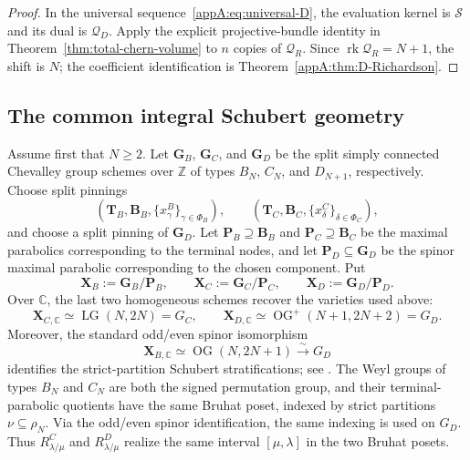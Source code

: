 \documentclass[11pt,a4paper,oneside]{amsart}
\numberwithin{equation}{section}
\theoremstyle{definition}
\theoremstyle{remark}
\begin{document}
\begin{proof}
In the universal sequence~\eqref{appA:eq:universal-D}, the evaluation kernel
is $\mathcal S$ and its dual is $\mathcal Q_D$.  Apply the explicit projective-bundle identity in
Theorem~\ref{thm:total-chern-volume} to $n$ copies of $\mathcal Q_R$.
Since $\operatorname{rk}\mathcal Q_R=N+1$, the shift is $N$; the coefficient
identification is Theorem~\ref{appA:thm:D-Richardson}.
\end{proof}


\subsection{The common integral Schubert geometry}
\label{appA:common-Schubert-geometry}

Assume first that $N\geq2$.  Let $\mathbf G_B$, $\mathbf G_C$, and
$\mathbf G_D$ be the split simply connected Chevalley group schemes over
$\mathbb Z$ of types $B_N$, $C_N$, and $D_{N+1}$, respectively.  Choose
split pinnings
\[
 (\mathbf T_B,\mathbf B_B,\{x^B_\gamma\}_{\gamma\in\Phi_B}),
 \qquad
 (\mathbf T_C,\mathbf B_C,\{x^C_\delta\}_{\delta\in\Phi_C}),
\]
and choose a split pinning of $\mathbf G_D$.  Let
$\mathbf P_B\supseteq\mathbf B_B$ and
$\mathbf P_C\supseteq\mathbf B_C$ be the maximal parabolics corresponding
to the terminal nodes, and let $\mathbf P_D\subseteq\mathbf G_D$ be the
spinor maximal parabolic corresponding to the chosen component.  Put
\[
 \mathbf X_B:=\mathbf G_B/\mathbf P_B,
 \qquad
 \mathbf X_C:=\mathbf G_C/\mathbf P_C,
 \qquad
 \mathbf X_D:=\mathbf G_D/\mathbf P_D.
\]
Over $\mathbb C$, the last two homogeneous schemes recover the varieties
used above:
\[
 \mathbf X_{C,\mathbb C}\simeq\operatorname{LG}(N,2N)=G_C,
 \qquad
 \mathbf X_{D,\mathbb C}\simeq
 \operatorname{OG}^{+}(N+1,2N+2)=G_D.
\]
Moreover, the standard odd/even spinor isomorphism
\[
 \mathbf X_{B,\mathbb C}\simeq\operatorname{OG}(N,2N+1)
 \xrightarrow{\sim}G_D
\]
identifies the strict-partition Schubert stratifications; see
\cite[Introduction and \S3.1]{KT04}.  The Weyl groups of types $B_N$ and
$C_N$ are both the signed permutation group, and their terminal-parabolic
quotients have the same Bruhat poset, indexed by strict partitions
$\nu\subseteq\rho_N$.  Via the odd/even spinor identification, the same
indexing is used on $G_D$.  Thus $R^C_{\lambda/\mu}$ and
$R^D_{\lambda/\mu}$ realize the same interval $[\mu,\lambda]$ in the two
Bruhat posets.
\end{document}
